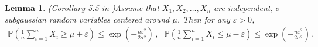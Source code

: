 \documentclass[letterpaper]{article} %
\newtheorem{lemma}{Lemma}
\newcommand{\bracket}[1]{\left(#1\right)}
\newcommand{\PP}[1]{\mathbb{P} \left(#1\right)}
\begin{document}
\begin{lemma}{(Corollary 5.5 in \cite{lattimore2020bandit})}\label{lem:chernoff}
Assume that $X_1, X_2,\ldots, X_n$ are independent, $\sigma$-subgaussian random variables centered around $\mu$. Then for any $\varepsilon > 0$,
\begin{align*}
    \PP{ \frac{1}{n} \sum_{i=1}^n X_i \ge  \mu + \varepsilon} \le \exp\bracket{-\frac{n\varepsilon^2}{2\sigma^2}}\,, \ \ \ \PP{ \frac{1}{n} \sum_{i=1}^n X_i \le  \mu - \varepsilon} \le \exp\bracket{-\frac{n\varepsilon^2}{2\sigma^2}}\,.
\end{align*}
\end{lemma}
\end{document}
